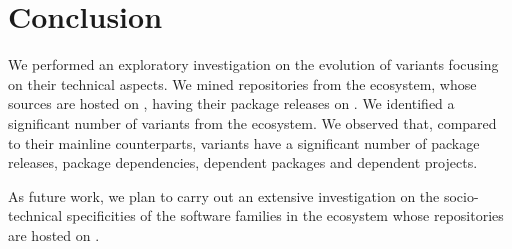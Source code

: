 \section{Conclusion}
\label{sec:conclusion}
We performed an exploratory investigation on the evolution of variants focusing on their technical aspects. We mined repositories from the \js ecosystem, whose sources are hosted on \gh, having their package releases on \npm.
We identified a significant number of variants from the \js ecosystem. We observed that, compared to their mainline counterparts, variants have a significant number of package releases, package dependencies, dependent packages and dependent projects.

As future work, we plan to carry out an extensive investigation on the socio-technical specificities of the software families in the \js ecosystem whose repositories are hosted on \gh. 


